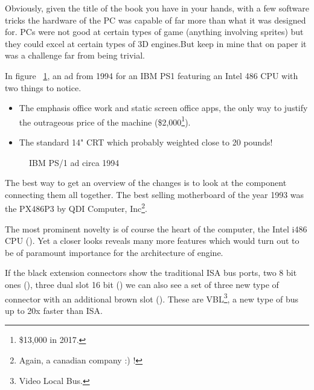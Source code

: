 \par
Obviously, given the title of the book you have in your hands, with a few software tricks the hardware of the PC was capable of far more than what it was designed for. PCs were not good at certain types of game (anything involving sprites) but they could excel at certain types of 3D engines.But keep in mine that on paper it was a challenge far from being trivial.\\
\par

In figure ~\ref{ibm_ps1_top}, an ad from 1994 for an IBM PS1 featuring an Intel 486 CPU with two things to notice.
\begin{itemize}
\item The emphasis office work and static screen office apps, the only way to justify the outrageous price of the machine (\$2,000\footnote{\$13,000 in 2017.}). 
\item The standard 14" CRT which probably weighted close to 20 pounds!\\
\end{itemize}
\par
\vspace{2 in}
\par
\begin{figure}[H] \centering
{}
\caption{IBM PS/1 ad circa 1994}
\label{ibm_ps1_top}
\end{figure}


















\cleartoleftpage
 
The best way to get an overview of the changes is to look at the component connecting them all together. The best selling motherboard of the year 1993 was the PX486P3 by QDI Computer, Inc\footnote{Again, a canadian company :) !}.\\

\par
The most prominent novelty is of course the heart of the computer, the Intel i486 CPU (). Yet a closer looks reveals many more features which would turn out to be of paramount importance for the architecture of \doom engine.\\
\par 
If the black extension connectors show the traditional ISA bus ports, two 8 bit ones (), three dual slot 16 bit () we can also see a set of three new type of connector with an additional brown slot (). These are VBL\footnote{Video Local Bus.}, a new type of bus up to 20x faster than ISA.

